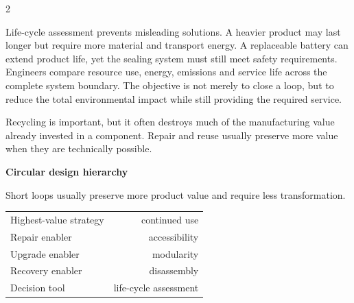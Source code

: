 \begin{multicols}{2}
\begin{ecarticle}
Life-cycle assessment prevents misleading solutions. A heavier product may last longer but require
more material and transport energy. A replaceable battery can extend product life, yet the sealing
system must still meet safety requirements. Engineers compare resource use, energy, emissions and
service life across the complete system boundary. The objective is not merely to close a loop, but to
reduce the total environmental impact while still providing the required service.
\end{ecarticle}

\begin{tcolorbox}[title=\sffamily\bfseries Did You Know?,colback=yellow!10,colframe=ECOrange]
Recycling is important, but it often destroys much of the manufacturing value already invested in a
component. Repair and reuse usually preserve more value when they are technically possible.
\end{tcolorbox}

\begin{engineeringfocus}
\textbf{Circular design hierarchy}
\begin{center}
\end{center}
Short loops usually preserve more product value and require less transformation.
\end{engineeringfocus}

\begin{keyfigures}
\begin{tabularx}{\linewidth}{@{}Xr@{}}
Highest-value strategy & continued use\\
Repair enabler & accessibility\\
Upgrade enabler & modularity\\
Recovery enabler & disassembly\\
Decision tool & life-cycle assessment
\end{tabularx}
\end{keyfigures}


\end{multicols}
